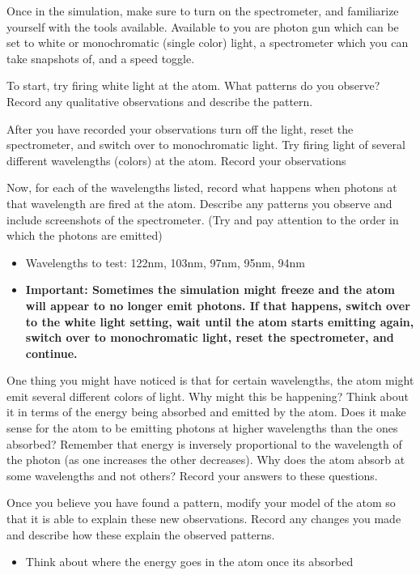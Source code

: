 \begin{steps} 
	\item Once in the simulation, make sure to turn on the spectrometer, and familiarize yourself with the tools available. Available to you are photon gun which can be set to white or monochromatic (single color) light, a spectrometer which you can take snapshots of, and a speed toggle.
	
	\item To start, try firing white light at the atom. What patterns do you observe? Record any qualitative observations and describe the pattern. 
	
	\item After you have recorded your observations turn off the light, reset the spectrometer, and switch over to monochromatic light. Try firing light of several different wavelengths (colors) at the atom. Record your observations
	
	\item Now, for each of the wavelengths listed, record what happens when photons at that wavelength are fired at the atom. Describe any patterns you observe and include screenshots of the spectrometer. (Try and pay attention to the order in which the photons are emitted)
	\begin{itemize}
		\item Wavelengths to test: 122nm, 103nm, 97nm, 95nm, 94nm 
		
		\item \textbf{Important: Sometimes the simulation might freeze and the atom will appear to no longer emit photons. If that happens, switch over to the white light setting, wait until the atom starts emitting again, switch over to monochromatic light, reset the spectrometer, and continue.}
	\end{itemize}
	
	\item One thing you might have noticed is that for certain wavelengths, the atom might emit several different colors of light. Why might this be happening? Think about it in terms of the energy being absorbed and emitted by the atom. Does it make sense for the atom to be emitting photons at higher wavelengths than the ones absorbed? Remember that energy is inversely proportional to the wavelength of the photon (as one increases the other decreases). Why does the atom absorb at some wavelengths and not others? Record your answers to these questions. 
	
	\item Once you believe you have found a pattern, modify your model of the atom so that it is able to explain these new observations. Record any changes you made and describe how these explain the observed patterns.
	\begin{itemize}
		\item Think about where the energy goes in the atom once its absorbed
		

\end{itemize}
\end{steps}
